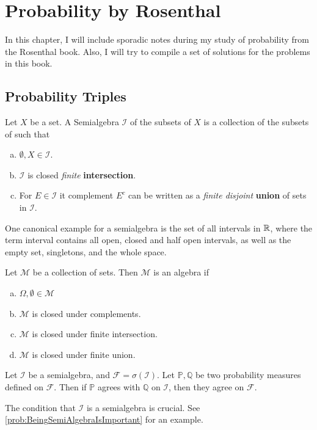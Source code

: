 \chapter{Probability by Rosenthal }
In this chapter, I will include sporadic notes during my study of probability from the Rosenthal book. Also, I will try to compile a set of solutions for the problems in this book.



\section{Probability Triples}

\begin{definition}[Semialgebra]
	Let $ X $ be a set. A Semialgebra $ \mathcal{I} $ of the subsets of $ X $ is a collection of the subsets of such that 
	\begin{enumerate}[(a)]
		\item $ \emptyset, X \in \mathcal{I} $.
		\item $ \mathcal{I} $ is closed \emph{finite} \textbf{intersection}.
		\item For $ E \in \mathcal{I} $ it complement $ E^c $ can be written as a \emph{finite disjoint} \textbf{union} of sets in $ \mathcal{I} $.
	\end{enumerate}
\end{definition}
\begin{remark}
	One canonical example for a semialgebra is the set of all intervals in $ \mathbb{R} $, where the term interval contains all open, closed and half open intervals, as well as the empty set, singletons, and the whole space. 
\end{remark}

\begin{definition}[Algebra]
	Let $ \mathcal{M} $ be a collection of sets. Then $ \mathcal{M} $ is an algebra if 
	\begin{enumerate}[(a)]
		\item $ \Omega, \emptyset \in \mathcal{M} $
		\item $ \mathcal{M} $ is closed under complements.
		\item $ \mathcal{M} $ is closed under finite intersection.
		\item $ \mathcal{M} $ is closed under finite union.
	\end{enumerate}
\end{definition}

\begin{proposition}
	Let $ \mathcal{I} $ be a semialgebra, and $ \mathcal{F} = \sigma(\mathcal{I}) $. Let $ \mathbb{P},\mathbb{Q} $ be two probability measures defined on $ \mathcal{F} $. Then if $ \mathbb{P} $ agrees with $ \mathbb{Q} $ on $ \mathcal{I} $, then they agree on $ \mathcal{F} $.
\end{proposition}
\begin{remark}
	The condition that $ \mathcal{I} $ is a semialgebra is crucial. See \autoref{prob:BeingSemiAlgebraIsImportant} for an example.
\end{remark}


